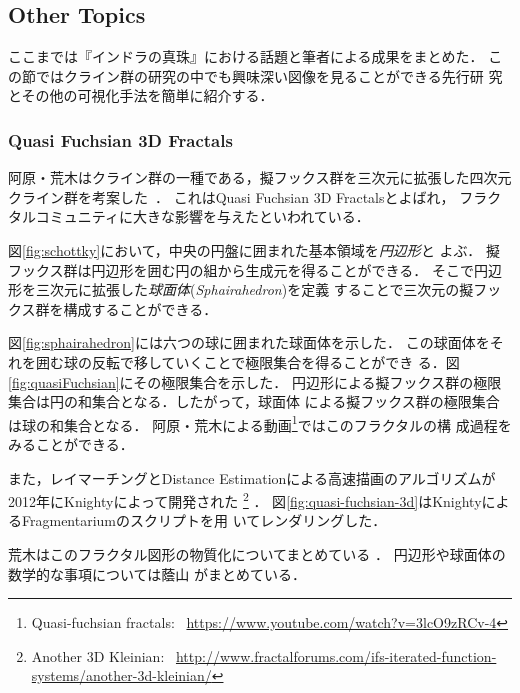 \subsection{Other Topics}

ここまでは『インドラの真珠』における話題と筆者による成果をまとめた．
この節ではクライン群の研究の中でも興味深い図像を見ることができる先行研
究とその他の可視化手法を簡単に紹介する．

\subsubsection{Quasi Fuchsian 3D Fractals}

阿原・荒木はクライン群の一種である，擬フックス群を三次元に拡張した四次元
クライン群を考案した\cite{ahara2003sphairahedral}~\cite{ahara2003sphaira}．
これはQuasi Fuchsian 3D Fractalsとよばれ，
フラクタルコミュニティに大きな影響を与えたといわれている．

図\ref{fig:schottky}において，中央の円盤に囲まれた基本領域を\emph{円辺形}と
よぶ．
擬フックス群は円辺形を囲む円の組から生成元を得ることができる．
そこで円辺形を三次元に拡張した\emph{球面体}(\textit{Sphairahedron})を定義
することで三次元の擬フックス群を構成することができる．

図\ref{fig:sphairahedron}には六つの球に囲まれた球面体を示した．
この球面体をそれを囲む球の反転で移していくことで極限集合を得ることができ
る．図\ref{fig:quasiFuchsian}にその極限集合を示した．
円辺形による擬フックス群の極限集合は円の和集合となる．したがって，球面体
による擬フックス群の極限集合は球の和集合となる．
阿原・荒木による動画\footnote{Quasi-fuchsian fractals:~
\url{https://www.youtube.com/watch?v=3lcO9zRCv-4}}ではこのフラクタルの構
成過程をみることができる．

また，レイマーチングとDistance Estimationによる高速描画のアルゴリズムが
2012年にKnightyによって開発された
\footnote{Another 3D Kleinian:~
\url{http://www.fractalforums.com/ifs-iterated-function-systems/another-3d-kleinian/}}
 ．
図\ref{fig:quasi-fuchsian-3d}はKnightyによるFragmentariumのスクリプトを用
いてレンダリングした．


荒木はこのフラクタル図形の物質化についてまとめている
\cite{araki2006materializing}．
円辺形や球面体の数学的な事項については蔭山
がまとめている\cite{kageyama2016masterSphaira}．


